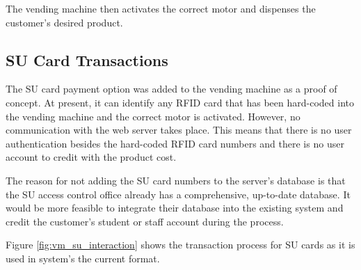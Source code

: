 The vending machine then activates the correct motor and dispenses the
customer's desired product.

\subsection{SU Card Transactions}
\label{sec:su-card}

The SU card payment option was added to the vending machine as a proof of
concept. At present, it can identify any RFID card that has been hard-coded
into the vending machine and the correct motor is activated. However, no
communication with the web server takes place. This means that there is no user
authentication besides the hard-coded RFID card numbers and there is no user
account to credit with the product cost.

The reason for not adding the SU card numbers to the server's database is that
the SU access control office already has a comprehensive, up-to-date database. It
would be more feasible to integrate their database into the existing system and
credit the customer's student or staff account during the process. 

Figure \ref{fig:vm_su_interaction} shows the transaction process for SU cards as it is
used in system's the current format. 

